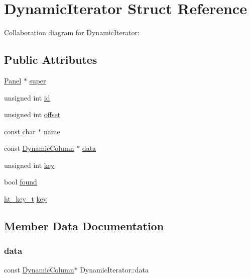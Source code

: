 \hypertarget{structDynamicIterator}{}\section{Dynamic\+Iterator Struct Reference}
\label{structDynamicIterator}


Collaboration diagram for Dynamic\+Iterator\+:
\subsection*{Public Attributes}
\begin{DoxyCompactItemize}
\item 
\hyperlink{Panel_8h_a034d4c16521db412dc7a1e8536d16fae}{Panel} $\ast$ \hyperlink{structDynamicIterator_a95461195c46ae98015e50fb6eef39479}{super}
\item 
unsigned int \hyperlink{structDynamicIterator_a8ca5ffa253fba6a213ceec6712f99a6c}{id}
\item 
unsigned int \hyperlink{structDynamicIterator_a3227b817fbf56e5954a8d3693240eb6e}{offset}
\item 
const char $\ast$ \hyperlink{structDynamicIterator_a05a3a8fad97d46e48145d31dbec3b1d8}{name}
\item 
const \hyperlink{DynamicColumn_8h_ae58b8180abf67f1af86ba3d6976de501}{Dynamic\+Column} $\ast$ \hyperlink{structDynamicIterator_a0431a488d9622cd19ae070264e6e0f5b}{data}
\item 
unsigned int \hyperlink{structDynamicIterator_a09f31ce63de8d6f003e7f36e88c1efa1}{key}
\item 
bool \hyperlink{structDynamicIterator_a8cfde17af0d9d434deb408e3aed52756}{found}
\item 
\hyperlink{Hashtable_8h_ac88d0518f664d4d4d74b5a1aa3453de3}{ht\+\_\+key\+\_\+t} \hyperlink{structDynamicIterator_a3b978157fcfe255cce68e893996c403e}{key}
\end{DoxyCompactItemize}


\subsection{Member Data Documentation}
\mbox{\label{structDynamicIterator_a0431a488d9622cd19ae070264e6e0f5b}} 
\subsubsection{\texorpdfstring{data}{data}}
{\footnotesize\ttfamily const \hyperlink{DynamicColumn_8h_ae58b8180abf67f1af86ba3d6976de501}{Dynamic\+Column}$\ast$ Dynamic\+Iterator\+::data}

